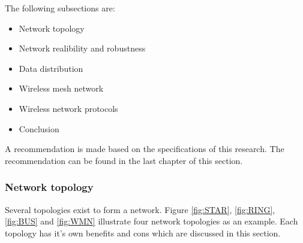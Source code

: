 \documentclass[10pt,a4paper]{article}
\begin{document}
The following subsections are:
\begin{itemize}
\setlength\itemsep{0em}
    \item Network topology
    \item Network realibility and robustness
    \item Data distribution
    \item Wireless mesh network
    \item Wireless network protocols
    \item Conclusion
\end{itemize}

A recommendation is made based on the specifications of this research. The recommendation can be found in the last chapter of this section.

\newpage
\subsubsection{Network topology}
Several topologies exist to form a network. Figure \ref{fig:STAR}, \ref{fig:RING}, \ref{fig:BUS} and \ref{fig:WMN} illustrate four network topologies as an example. Each topology has it's own benefits and cons which are discussed in this section.
\end{document}
